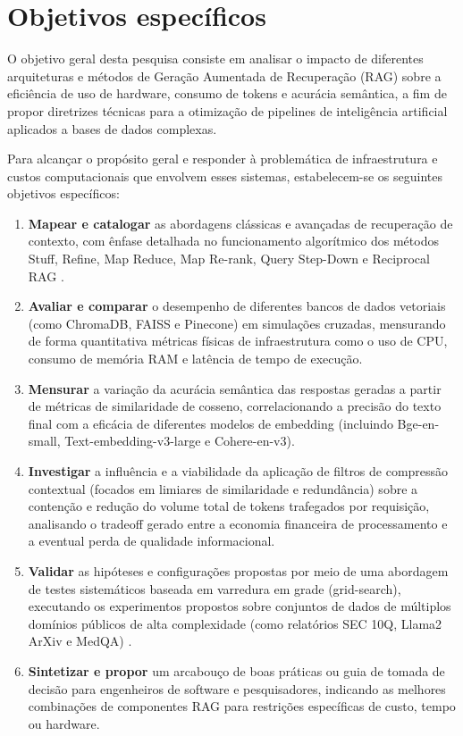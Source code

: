 \newpage
\section{Objetivos específicos}
\label{sc:objetivos}

O objetivo geral desta pesquisa consiste em analisar o impacto de diferentes arquiteturas e métodos de Geração Aumentada de Recuperação (RAG) sobre a eficiência de uso de hardware, consumo de tokens e acurácia semântica, a fim de propor diretrizes técnicas para a otimização de pipelines de inteligência artificial aplicados a bases de dados complexas.

Para alcançar o propósito geral e responder à problemática de infraestrutura e custos computacionais que envolvem esses sistemas, estabelecem-se os seguintes objetivos específicos:

\begin{enumerate}
    \item \textbf{Mapear e catalogar} as abordagens clássicas e avançadas de recuperação de contexto, com ênfase detalhada no funcionamento algorítmico dos métodos Stuff, Refine, Map Reduce, Map Re-rank, Query Step-Down e Reciprocal RAG \cite{topsakal2023langchain}.
    \item \textbf{Avaliar e comparar} o desempenho de diferentes bancos de dados vetoriais (como ChromaDB, FAISS e Pinecone) em simulações cruzadas, mensurando de forma quantitativa métricas físicas de infraestrutura como o uso de CPU, consumo de memória RAM e latência de tempo de execução.
    
    \item \textbf{Mensurar} a variação da acurácia semântica das respostas geradas a partir de métricas de similaridade de cosseno, correlacionando a precisão do texto final com a eficácia de diferentes modelos de embedding (incluindo Bge-en-small, Text-embedding-v3-large e Cohere-en-v3).

    \item \textbf{Investigar} a influência e a viabilidade da aplicação de filtros de compressão contextual (focados em limiares de similaridade e redundância) sobre a contenção e redução do volume total de tokens trafegados por requisição, analisando o tradeoff gerado entre a economia financeira de processamento e a eventual perda de qualidade informacional.

    \item \textbf{Validar} as hipóteses e configurações propostas por meio de uma abordagem de testes sistemáticos baseada em varredura em grade (grid-search), executando os experimentos propostos sobre conjuntos de dados de múltiplos domínios públicos de alta complexidade (como relatórios SEC 10Q, Llama2 ArXiv e MedQA) \cite{sakar2025rag}.

     \item \textbf{Sintetizar e propor} um arcabouço de boas práticas ou guia de tomada de decisão para engenheiros de software e pesquisadores, indicando as melhores combinações de componentes RAG para restrições específicas de custo, tempo ou hardware.
    
\end{enumerate}